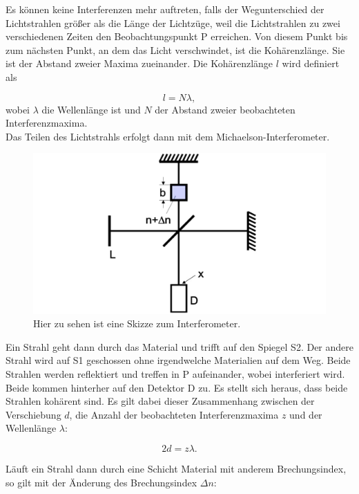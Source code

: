 Es können keine Interferenzen mehr auftreten, falls der Wegunterschied der Lichtstrahlen größer als die Länge der Lichtzüge, weil die Lichtstrahlen zu zwei verschiedenen Zeiten den Beobachtungspunkt P erreichen. Von diesem Punkt bis zum nächsten Punkt, an dem das Licht verschwindet, ist die Kohärenzlänge. Sie ist der Abstand zweier Maxima zueinander. Die Kohärenzlänge \(l\) wird definiert als

\begin{equation}
    l = N\lambda,
\end{equation}
wobei \(\lambda\) die Wellenlänge ist und \(N\) der Abstand zweier beobachteten Interferenzmaxima.
\\
Das Teilen des Lichtstrahls erfolgt dann mit dem Michaelson-Interferometer.

\begin{figure}
    \centering
    \includegraphics[scale = 0.5]{content/Interferometer.pdf}
    \caption{Hier zu sehen ist eine Skizze zum Interferometer.}
    \label{fig:Interferometer}
\end{figure}

Ein Strahl geht dann durch das Material und trifft auf den Spiegel S2. Der andere Strahl wird auf S1 geschossen ohne irgendwelche Materialien auf dem Weg. Beide Strahlen werden reflektiert und treffen in P aufeinander, wobei interferiert wird. Beide kommen hinterher auf den Detektor D zu. Es stellt sich heraus, dass beide Strahlen kohärent sind. Es gilt dabei dieser Zusammenhang zwischen der Verschiebung \(d\), die Anzahl der beobachteten Interferenzmaxima \(z\) und der Wellenlänge \(\lambda\):

\begin{equation}
   2d=z\lambda.
   \label{eq:verschiebung}
\end{equation}

Läuft ein Strahl dann durch eine Schicht Material mit anderem Brechungsindex, so gilt mit der Änderung des Brechungsindex \(\Delta n\):

